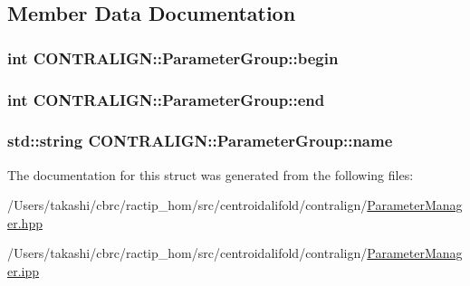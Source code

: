 \subsection{Member Data Documentation}
\hypertarget{struct_c_o_n_t_r_a_l_i_g_n_1_1_parameter_group_a01e00b1d2abfda8cdce842800306ad0f}{
\subsubsection[{begin}]{\setlength{\rightskip}{0pt plus 5cm}int C\+O\+N\+T\+R\+A\+L\+I\+G\+N\+::\+Parameter\+Group\+::begin}}\label{struct_c_o_n_t_r_a_l_i_g_n_1_1_parameter_group_a01e00b1d2abfda8cdce842800306ad0f}
\hypertarget{struct_c_o_n_t_r_a_l_i_g_n_1_1_parameter_group_ae458d3b09c3bad4aa3c0827c5ecf8c60}{
\subsubsection[{end}]{\setlength{\rightskip}{0pt plus 5cm}int C\+O\+N\+T\+R\+A\+L\+I\+G\+N\+::\+Parameter\+Group\+::end}}\label{struct_c_o_n_t_r_a_l_i_g_n_1_1_parameter_group_ae458d3b09c3bad4aa3c0827c5ecf8c60}
\hypertarget{struct_c_o_n_t_r_a_l_i_g_n_1_1_parameter_group_adb73e76d451ef904109962ea5f77f52e}{
\subsubsection[{name}]{\setlength{\rightskip}{0pt plus 5cm}std\+::string C\+O\+N\+T\+R\+A\+L\+I\+G\+N\+::\+Parameter\+Group\+::name}}\label{struct_c_o_n_t_r_a_l_i_g_n_1_1_parameter_group_adb73e76d451ef904109962ea5f77f52e}


The documentation for this struct was generated from the following files\+:\begin{DoxyCompactItemize}
\item 
/\+Users/takashi/cbrc/ractip\+\_\+hom/src/centroidalifold/contralign/\hyperlink{centroidalifold_2contralign_2_parameter_manager_8hpp}{Parameter\+Manager.\+hpp}\item 
/\+Users/takashi/cbrc/ractip\+\_\+hom/src/centroidalifold/contralign/\hyperlink{centroidalifold_2contralign_2_parameter_manager_8ipp}{Parameter\+Manager.\+ipp}\end{DoxyCompactItemize}
